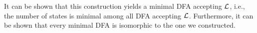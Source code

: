 It can be shown that this construction yields a minimal DFA accepting
$\mathcal{L}$, i.e., the number of states is minimal among all DFA
accepting $\mathcal{L}$. Furthermore, it can be shown that every minimal DFA
is isomorphic to the one we constructed.







